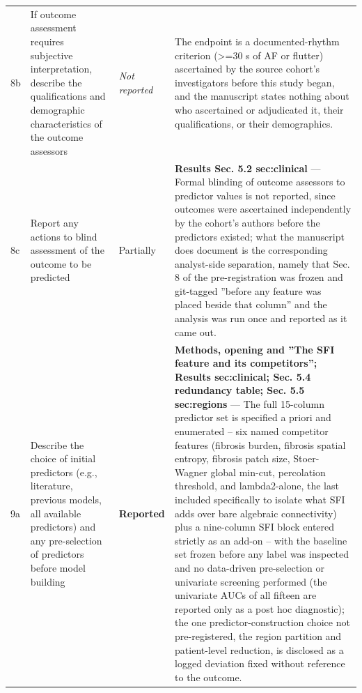 \documentclass[10pt]{article}
\begin{document}
\begin{longtable}{@{}p{0.9cm} p{6.2cm} p{1.9cm} p{12.4cm}@{}}
8b & If outcome assessment requires subjective interpretation, describe the qualifications and demographic characteristics of the outcome assessors & \emph{Not reported} & The endpoint is a documented-rhythm criterion (>=30 s of AF or flutter) ascertained by the source cohort's investigators before this study began, and the manuscript states nothing about who ascertained or adjudicated it, their qualifications, or their demographics. \\[2pt]
8c & Report any actions to blind assessment of the outcome to be predicted & Partially & \textbf{Results Sec. 5.2 sec:clinical} --- Formal blinding of outcome assessors to predictor values is not reported, since outcomes were ascertained independently by the cohort's authors before the predictors existed; what the manuscript does document is the corresponding analyst-side separation, namely that Sec. 8 of the pre-registration was frozen and git-tagged ''before any feature was placed beside that column'' and the analysis was run once and reported as it came out. \\[2pt]
9a & Describe the choice of initial predictors (e.g., literature, previous models, all available predictors) and any pre-selection of predictors before model building & \textbf{Reported} & \textbf{Methods, opening and ''The SFI feature and its competitors''; Results sec:clinical; Sec. 5.4 redundancy table; Sec. 5.5 sec:regions} --- The full 15-column predictor set is specified a priori and enumerated -- six named competitor features (fibrosis burden, fibrosis spatial entropy, fibrosis patch size, Stoer-Wagner global min-cut, percolation threshold, and lambda2-alone, the last included specifically to isolate what SFI adds over bare algebraic connectivity) plus a nine-column SFI block entered strictly as an add-on -- with the baseline set frozen before any label was inspected and no data-driven pre-selection or univariate screening performed (the univariate AUCs of all fifteen are reported only as a post hoc diagnostic); the one predictor-construction choice not pre-registered, the region partition and patient-level reduction, is disclosed as a logged deviation fixed without reference to the outcome. \\[2pt]

\end{longtable}
\end{document}
